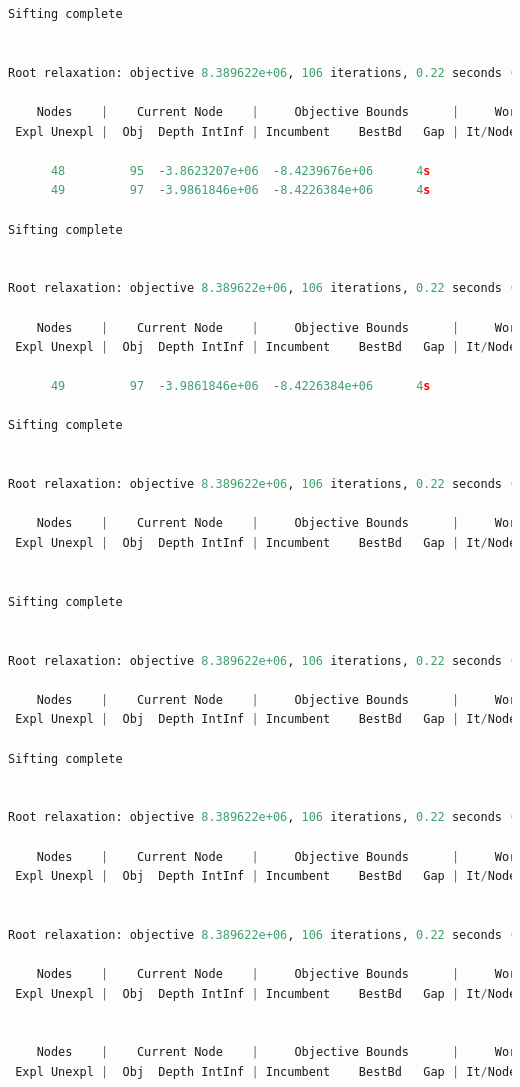 \documentclass[12pt,nonblindrev]{write_paper}
\begin{document}
\begin{lstlisting}[language=python]
Sifting complete


Root relaxation: objective 8.389622e+06, 106 iterations, 0.22 seconds (0.14 work units)

    Nodes    |    Current Node    |     Objective Bounds      |     Work
 Expl Unexpl |  Obj  Depth IntInf | Incumbent    BestBd   Gap | It/Node Time

      48         95  -3.8623207e+06  -8.4239676e+06      4s
      49         97  -3.9861846e+06  -8.4226384e+06      4s

Sifting complete


Root relaxation: objective 8.389622e+06, 106 iterations, 0.22 seconds (0.14 work units)

    Nodes    |    Current Node    |     Objective Bounds      |     Work
 Expl Unexpl |  Obj  Depth IntInf | Incumbent    BestBd   Gap | It/Node Time

      49         97  -3.9861846e+06  -8.4226384e+06      4s

Sifting complete


Root relaxation: objective 8.389622e+06, 106 iterations, 0.22 seconds (0.14 work units)

    Nodes    |    Current Node    |     Objective Bounds      |     Work
 Expl Unexpl |  Obj  Depth IntInf | Incumbent    BestBd   Gap | It/Node Time


Sifting complete


Root relaxation: objective 8.389622e+06, 106 iterations, 0.22 seconds (0.14 work units)

    Nodes    |    Current Node    |     Objective Bounds      |     Work
 Expl Unexpl |  Obj  Depth IntInf | Incumbent    BestBd   Gap | It/Node Time

Sifting complete


Root relaxation: objective 8.389622e+06, 106 iterations, 0.22 seconds (0.14 work units)

    Nodes    |    Current Node    |     Objective Bounds      |     Work
 Expl Unexpl |  Obj  Depth IntInf | Incumbent    BestBd   Gap | It/Node Time


Root relaxation: objective 8.389622e+06, 106 iterations, 0.22 seconds (0.14 work units)

    Nodes    |    Current Node    |     Objective Bounds      |     Work
 Expl Unexpl |  Obj  Depth IntInf | Incumbent    BestBd   Gap | It/Node Time


    Nodes    |    Current Node    |     Objective Bounds      |     Work
 Expl Unexpl |  Obj  Depth IntInf | Incumbent    BestBd   Gap | It/Node Time



\end{lstlisting}
\end{document}
